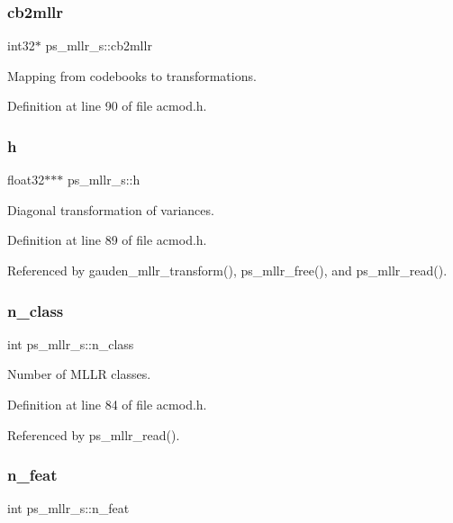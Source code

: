\subsubsection{cb2mllr}
{\footnotesize\ttfamily int32$\ast$ ps\+\_\+mllr\+\_\+s\+::cb2mllr}



Mapping from codebooks to transformations. 



Definition at line 90 of file acmod.\+h.

\mbox{\label{structps__mllr__s_ae92b910e17202389aca99ee5105085b0}} 
\subsubsection{h}
{\footnotesize\ttfamily float32$\ast$$\ast$$\ast$ ps\+\_\+mllr\+\_\+s\+::h}



Diagonal transformation of variances. 



Definition at line 89 of file acmod.\+h.



Referenced by gauden\+\_\+mllr\+\_\+transform(), ps\+\_\+mllr\+\_\+free(), and ps\+\_\+mllr\+\_\+read().

\mbox{\label{structps__mllr__s_a30b9bb76c5469542d531ead4ad1bdcb1}} 
\subsubsection{n\+\_\+class}
{\footnotesize\ttfamily int ps\+\_\+mllr\+\_\+s\+::n\+\_\+class}



Number of M\+L\+LR classes. 



Definition at line 84 of file acmod.\+h.



Referenced by ps\+\_\+mllr\+\_\+read().

\mbox{\label{structps__mllr__s_acc9e853a333f4e79b24f3e5af0946e43}} 
\subsubsection{n\+\_\+feat}
{\footnotesize\ttfamily int ps\+\_\+mllr\+\_\+s\+::n\+\_\+feat}



